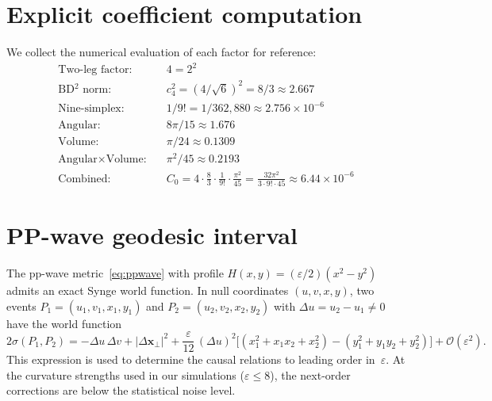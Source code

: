 \documentclass[12pt,a4paper]{article}
\theoremstyle{plain}
\theoremstyle{definition}
\theoremstyle{remark}
\newcommand{\order}{\mathcal{O}}
\begin{document}
\appendix

\section{Explicit coefficient computation}
\label{app:coefficient}

We collect the numerical evaluation of each factor for reference:
\begin{align}
  \text{Two-leg factor:} \quad & 4 = 2^2 \\
  \text{BD}{}^2 \text{ norm:} \quad & c_4^2 = (4/\sqrt{6})^2 = 8/3
  \approx 2.667 \\
  \text{Nine-simplex:} \quad & 1/9! = 1/362{,}880
  \approx 2.756 \times 10^{-6} \\
  \text{Angular:} \quad & 8\pi/15 \approx 1.676 \\
  \text{Volume:} \quad & \pi/24 \approx 0.1309 \\
  \text{Angular} \times \text{Volume:} \quad
  & \pi^2/45 \approx 0.2193 \\
  \text{Combined:} \quad
  & C_0 = 4 \cdot \frac{8}{3} \cdot \frac{1}{9!}
    \cdot \frac{\pi^2}{45}
  = \frac{32\pi^2}{3 \cdot 9! \cdot 45}
  \approx 6.44 \times 10^{-6}
\end{align}

\section{PP-wave geodesic interval}
\label{app:ppwave}

The pp-wave metric~\eqref{eq:ppwave} with profile
$H(x,y) = (\varepsilon/2)(x^2 - y^2)$ admits an exact Synge
world function.  In null coordinates $(u, v, x, y)$, two
events $P_1 = (u_1, v_1, x_1, y_1)$ and $P_2 = (u_2, v_2,
x_2, y_2)$ with $\Delta u = u_2 - u_1 \neq 0$ have the world
function
\begin{equation}\label{eq:synge}
  2\sigma(P_1, P_2) = -\Delta u\, \Delta v
  + |\Delta \mathbf{x}_\perp|^2
  + \frac{\varepsilon}{12}\,(\Delta u)^2
    \bigl[(x_1^2 + x_1 x_2 + x_2^2) - (y_1^2 + y_1 y_2 + y_2^2)\bigr]
  + \order(\varepsilon^2).
\end{equation}
This expression is used to determine the causal relations to
leading order in~$\varepsilon$.  At the curvature strengths used
in our simulations ($\varepsilon \leq 8$), the next-order
corrections are below the statistical noise level.
\end{document}
